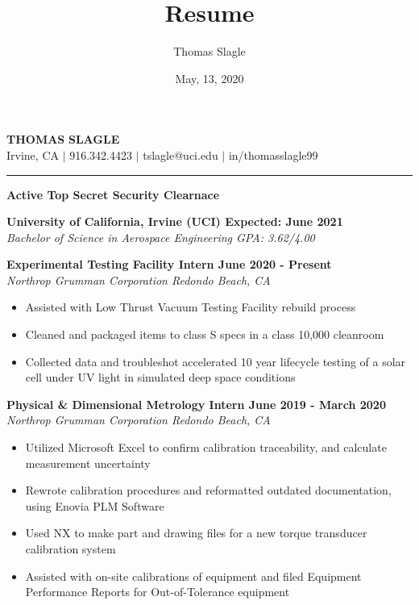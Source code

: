 \documentclass[10pt]{article}
\newcommand{\doublerule}[1][.4pt]{%
  \noindent
  \makebox[0pt][l]{\rule[.7ex]{\linewidth}{#1}}%
  \rule[.3ex]{\linewidth}{#1}}
\begin{document}
\title{Resume}
\author{Thomas Slagle}
\date{May, 13, 2020}

\thispagestyle{empty}
\pagestyle{empty}


\begin{center}
    {\LARGE\textbf{T}\Large\textbf{HOMAS} \LARGE\textbf{S}\Large\textbf{LAGLE}} \\
    Irvine, CA $\mid$ 916.342.4423 $\mid$ tslagle@uci.edu $\mid$ in/thomasslagle99
    \doublerule[1pt]
\end{center}

\begin{center}
    \noindent\textbf{Active Top Secret Security Clearnace}\\
\end{center}


\vspace{0.001in}

\myrule

\noindent\textbf{University of California, Irvine (UCI) \hfill Expected: June 2021}\\
\textit{Bachelor of Science in Aerospace Engineering \hfill GPA: 3.62/4.00}

\vspace{0.15in}

\myrule
\noindent\textbf{Experimental Testing Facility Intern \hfill June 2020 - Present}\\
\textit{Northrop Grumman Corporation \hfill Redondo Beach, CA}
\begin{itemize}
    \item Assisted with Low Thrust Vacuum Testing Facility rebuild process
    \item Cleaned and packaged items to class S specs in a class 10,000 cleanroom
    \item Collected data and troubleshot accelerated 10 year lifecycle testing of a solar cell under UV light in simulated deep space conditions
\end{itemize}

\vspace{0.08in}

\noindent\textbf{Physical \& Dimensional Metrology Intern \hfill June 2019 - March 2020}\\
\textit{Northrop Grumman Corporation \hfill Redondo Beach, CA}
\begin{itemize}
    \item Utilized Microsoft Excel to confirm calibration traceability, and calculate measurement uncertainty
    \item Rewrote calibration procedures and reformatted outdated documentation, using Enovia PLM Software
    \item Used NX to make part and drawing files for a new torque transducer calibration system
    \item Assisted with on-site calibrations of equipment and filed Equipment Performance Reports for Out-of-Tolerance equipment

\end{itemize}
\end{document}
